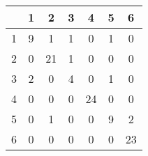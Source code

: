 \begin{center}
    \begin{tabular}{ | l || c | c | c | c | c | c | }
    \hline
          & 1 & 2 & 3 & 4 & 5 & 6 \\ \hline \hline
        1 & 9 & 1 & 1 & 0 & 1 & 0 \\ \hline
        2 & 0 & 21 & 1 & 0 & 0 & 0 \\ \hline
        3 & 2 & 0 & 4 & 0 & 1 & 0 \\ \hline
        4 & 0 & 0 & 0 & 24 & 0 & 0 \\ \hline
        5 & 0 & 1 & 0 & 0 & 9 & 2 \\ \hline
        6 & 0 & 0 & 0 & 0 & 0 & 23 \\ \hline
    \end{tabular}
\end{center}
